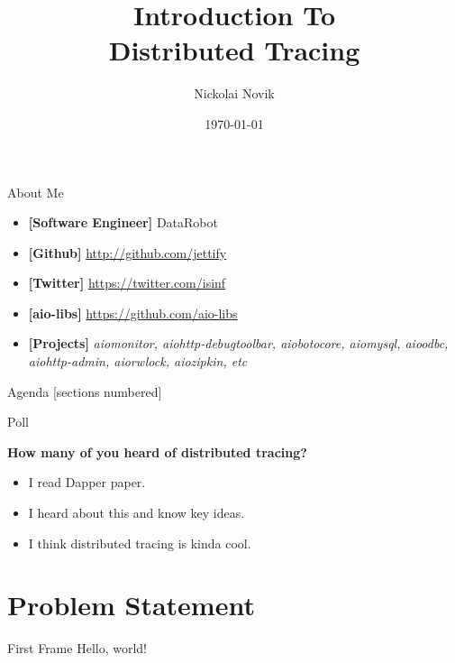\documentclass[14pt]{beamer}
\title{Introduction To \\ Distributed Tracing}
\date{\today}
\author{Nickolai Novik}
\institute{\href{http://github.com/jettify}{http://github.com/jettify}}
\begin{document}
  \maketitle
  \begin{frame}{About Me}
    \begin{itemize}
        \item \textbf{[Software Engineer]}  DataRobot
        \item \textbf{[Github]}
            \href{http://github.com/jettify}{http://github.com/jettify}
        \item \textbf{[Twitter]}
            \href{https://twitter.com/isinf}{https://twitter.com/isinf}
        \item \textbf{[aio-libs]}
            \href{https://github.com/aio-libs}{https://github.com/aio-libs}
        \item \textbf{[Projects]}
            \textit{aiomonitor, aiohttp-debugtoolbar,
          aiobotocore, aiomysql, aioodbc, aiohttp-admin, aiorwlock,
          aiozipkin, etc}
    \end{itemize}
  \end{frame}
  \begin{frame}{Agenda}
    [sections numbered]
    \tableofcontents[hideallsubsections]
  \end{frame}
  \begin{frame}{Poll}
      \begin{large}
          \textbf{How many of you heard of distributed tracing?}
      \end{large}
    \begin{itemize}
      \item I read Dapper paper.
      \item I heard about this and know key ideas.
      \item I think distributed tracing is kinda cool.
    \end{itemize}
  \end{frame}
  \section{Problem Statement}
  \begin{frame}{First Frame}
    Hello, world!
  \end{frame}
\end{document}
